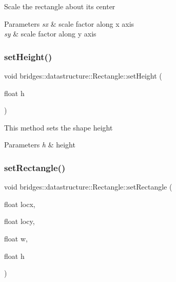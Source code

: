 Scale the rectangle about its center


\begin{DoxyParams}{Parameters}
{\em sx} & scale factor along x axis \\
\hline
{\em sy} & scale factor along y axis \\
\hline
\end{DoxyParams}
\mbox{\label{classbridges_1_1datastructure_1_1_rectangle_a6a3e99759282dd822c5615d1643f2a81}} 
\subsubsection{\texorpdfstring{set\+Height()}{setHeight()}}
{\footnotesize\ttfamily void bridges\+::datastructure\+::\+Rectangle\+::set\+Height (\begin{DoxyParamCaption}\item[{float}]{h }\end{DoxyParamCaption})\hspace{0.3cm}{\ttfamily [inline]}}

This method sets the shape height


\begin{DoxyParams}{Parameters}
{\em h} & height \\
\hline
\end{DoxyParams}
\mbox{\label{classbridges_1_1datastructure_1_1_rectangle_a01e49a75f3826ea63e581d3669e3626b}} 
\subsubsection{\texorpdfstring{set\+Rectangle()}{setRectangle()}}
{\footnotesize\ttfamily void bridges\+::datastructure\+::\+Rectangle\+::set\+Rectangle (\begin{DoxyParamCaption}\item[{float}]{locx,  }\item[{float}]{locy,  }\item[{float}]{w,  }\item[{float}]{h }\end{DoxyParamCaption})\hspace{0.3cm}{\ttfamily [inline]}}

